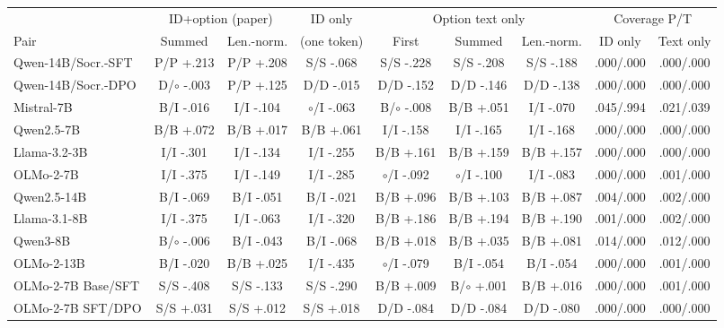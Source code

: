 \begin{table}[t]
\centering\scriptsize
\setlength{\tabcolsep}{3pt}
\begin{tabular}{@{}lcc@{\hspace{6pt}}c@{\hspace{6pt}}ccc@{\hspace{6pt}}cc@{}}
\toprule
& \multicolumn{2}{c}{ID+option (paper)} & ID only & \multicolumn{3}{c}{Option text only} & \multicolumn{2}{c}{Coverage P/T} \\
\cmidrule(lr){2-3}\cmidrule(lr){4-4}\cmidrule(lr){5-7}\cmidrule(l){8-9}
Pair & Summed & Len.-norm. & (one token) & First & Summed & Len.-norm. & ID only & Text only \\
\midrule
Qwen-14B/Socr.-SFT & P/P +.213 & P/P +.208 & S/S -.068 & S/S -.228 & S/S -.208 & S/S -.188 & .000/.000 & .000/.000 \\
Qwen-14B/Socr.-DPO & D/$\circ$ -.003 & P/P +.125 & D/D -.015 & D/D -.152 & D/D -.146 & D/D -.138 & .000/.000 & .000/.000 \\
\addlinespace[2pt]
Mistral-7B & B/I -.016 & I/I -.104 & $\circ$/I -.063 & B/$\circ$ -.008 & B/B +.051 & I/I -.070 & .045/.994 & .021/.039 \\
Qwen2.5-7B & B/B +.072 & B/B +.017 & B/B +.061 & I/I -.158 & I/I -.165 & I/I -.168 & .000/.000 & .000/.000 \\
Llama-3.2-3B & I/I -.301 & I/I -.134 & I/I -.255 & B/B +.161 & B/B +.159 & B/B +.157 & .000/.000 & .000/.000 \\
OLMo-2-7B & I/I -.375 & I/I -.149 & I/I -.285 & $\circ$/I -.092 & $\circ$/I -.100 & I/I -.083 & .000/.000 & .001/.000 \\
\addlinespace[2pt]
Qwen2.5-14B & B/I -.069 & B/I -.051 & B/I -.021 & B/B +.096 & B/B +.103 & B/B +.087 & .004/.000 & .002/.000 \\
Llama-3.1-8B & I/I -.375 & I/I -.063 & I/I -.320 & B/B +.186 & B/B +.194 & B/B +.190 & .001/.000 & .002/.000 \\
Qwen3-8B & B/$\circ$ -.006 & B/I -.043 & B/I -.068 & B/B +.018 & B/B +.035 & B/B +.081 & .014/.000 & .012/.000 \\
OLMo-2-13B & B/I -.020 & B/B +.025 & I/I -.435 & $\circ$/I -.079 & B/I -.054 & B/I -.054 & .000/.000 & .001/.000 \\
\addlinespace[2pt]
OLMo-2-7B Base/SFT & S/S -.408 & S/S -.133 & S/S -.290 & B/B +.009 & B/$\circ$ +.001 & B/B +.016 & .000/.000 & .001/.000 \\
OLMo-2-7B SFT/DPO & S/S +.031 & S/S +.012 & S/S +.018 & D/D -.084 & D/D -.084 & D/D -.080 & .000/.000 & .000/.000 \\

\end{tabular}
\end{table}
